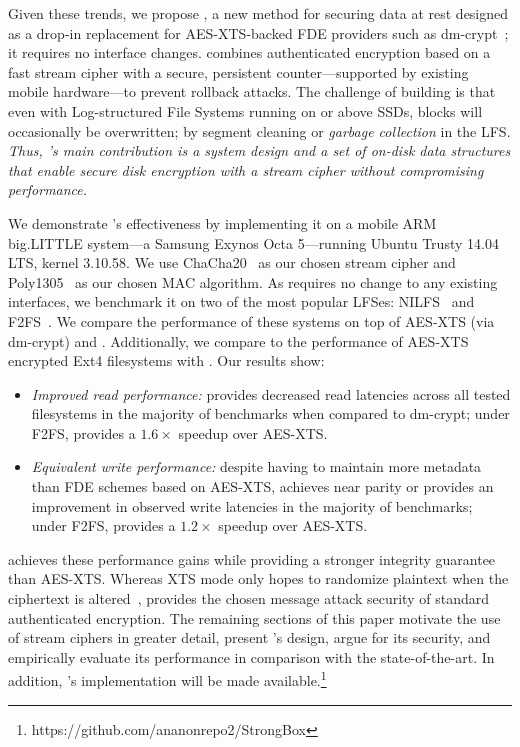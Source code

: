 Given these trends, we propose \SYSTEM{}, a new method for securing data at rest designed as a
drop-in replacement for AES-XTS-backed FDE providers such as dm-crypt~\cite{dmcrypt};
\ie{} it requires no interface changes. \SYSTEM{} combines authenticated encryption based
on a fast stream cipher with a secure, persistent counter---supported by existing
mobile hardware---to prevent rollback attacks. The challenge of building \SYSTEM{} is
that even with Log-structured File Systems running on or above SSDs, blocks will
occasionally be overwritten; \eg{} by segment cleaning or \emph{garbage collection} in
the LFS. \emph{Thus, \SYSTEM{}'s main contribution is a system design and a set of
on-disk data structures that enable secure disk encryption with a stream cipher without
compromising performance.}

We demonstrate \SYSTEM{}'s effectiveness by implementing it on a mobile ARM
big.LITTLE system---a Samsung Exynos Octa 5---running Ubuntu Trusty 14.04 LTS,
kernel 3.10.58. We use ChaCha20~\cite{ChaCha20} as our chosen stream cipher and
Poly1305~\cite{Poly1305} as our chosen MAC algorithm.  As \SYSTEM{} requires no
change to any existing interfaces, we benchmark it on two of the most popular
LFSes: NILFS~\cite{NILFS} and F2FS~\cite{F2FS}. We compare the performance of
these systems on top of AES-XTS (via dm-crypt) and \SYSTEM{}. Additionally, we
compare to the performance of AES-XTS encrypted Ext4 filesystems with \SYSTEM{}.
Our results show:

\begin{itemize}
\item \emph{Improved read performance:} \SYSTEM{} provides decreased
  read latencies across all tested filesystems in the majority of
  benchmarks when compared to dm-crypt; \ie under F2FS, \SYSTEM{}
  provides a $1.6\times$ speedup over AES-XTS.

\item \emph{Equivalent write performance:} despite having to maintain
  more metadata than FDE schemes based on AES-XTS, \SYSTEM{} achieves
  near parity or provides an improvement in observed write latencies
  in the majority of benchmarks; \ie under F2FS, \SYSTEM{} provides a
  $1.2\times$ speedup over AES-XTS.

\end{itemize}

\SYSTEM{} achieves these performance gains while providing a stronger integrity guarantee
than AES-XTS. Whereas XTS mode only hopes to randomize plaintext when the ciphertext is
altered~\cite{XTS}, \SYSTEM{} provides the chosen message attack security of standard
authenticated encryption. The remaining sections of this paper motivate the use of stream
ciphers in greater detail, present \SYSTEM{}'s design, argue for its security, and
empirically evaluate its performance in comparison with the state-of-the-art. In
addition, \SYSTEM{}'s implementation will be made
available.\footnote{https://github.com/ananonrepo2/StrongBox}


